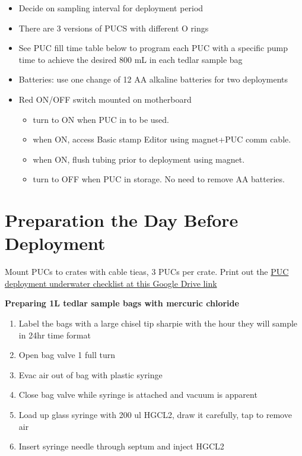 \documentclass[
]{book}
\providecommand{\tightlist}{%
  \setlength{\itemsep}{0pt}\setlength{\parskip}{0pt}}
\begin{document}
\begin{itemize}
\item
  Decide on sampling interval for deployment period
\item
  There are 3 versions of PUCS with different O rings
\item
  See PUC fill time table below to program each PUC with a specific pump time to achieve the desired 800 mL in each tedlar sample bag
\item
  Batteries: use one change of 12 AA alkaline batteries for two deployments
\item
  Red ON/OFF switch mounted on motherboard

  \begin{itemize}
  \tightlist
  \item
    turn to ON when PUC in to be used.
  \item
    when ON, access Basic stamp Editor using magnet+PUC comm cable.
  \item
    when ON, flush tubing prior to deployment using magnet.
  \item
    turn to OFF when PUC in storage. No need to remove AA batteries.
  \end{itemize}
\end{itemize}

\hypertarget{preparation-the-day-before-deployment}{%
\section{Preparation the Day Before Deployment}\label{preparation-the-day-before-deployment}}

Mount PUCs to crates with cable tieas, 3 PUCs per crate. Print out the \href{https://drive.google.com/drive/folders/1X6fAG4OIDs66Ji5xzYsX8JySqhkSs5k-}{PUC deployment underwater checklist at this Google Drive link}

\textbf{Preparing 1L tedlar sample bags with mercuric chloride}

\begin{enumerate}
\def\labelenumi{\arabic{enumi}.}
\tightlist
\item
  Label the bags with a large chisel tip sharpie with the hour they will sample in 24hr time format
\item
  Open bag valve 1 full turn
\item
  Evac air out of bag with plastic syringe
\item
  Close bag valve while syringe is attached and vacuum is apparent
\item
  Load up glass syringe with 200 ul HGCL2, draw it carefully, tap to remove air
\item
  Insert syringe needle through septum and inject HGCL2
\end{enumerate}
\end{document}
